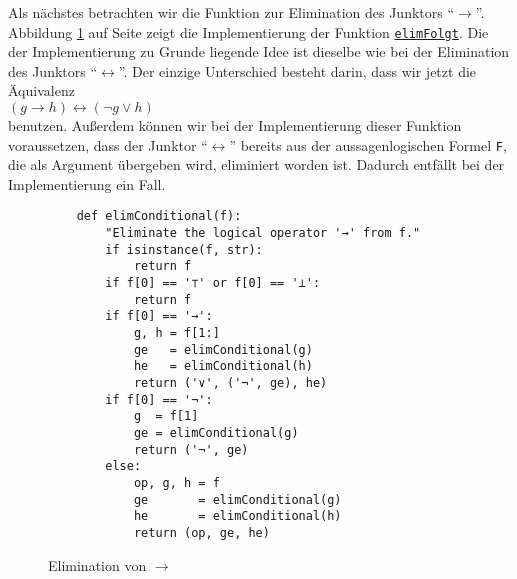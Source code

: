 Als nächstes betrachten wir die Funktion zur Elimination des Junktors ``$\rightarrow$''. 
Abbildung
\ref{fig:eliminate-folgt} auf Seite \pageref{fig:eliminate-folgt} zeigt die
Implementierung der Funktion
\href{https://github.com/karlstroetmann/Logic/blob/master/Python/CNF.ipynb}{\texttt{elimFolgt}}.
Die der Implementierung zu Grunde liegende Idee ist dieselbe wie bei der Elimination des
Junktors ``$\leftrightarrow$''.  Der einzige Unterschied besteht darin, dass wir jetzt die
Äquivalenz \\[0.2cm]
\hspace*{1.3cm}
$(g \rightarrow h) \leftrightarrow (\neg g \vee h)$ \\[0.2cm]
benutzen.  Außerdem können wir bei der Implementierung dieser Funktion voraussetzen, dass der Junktor ``$\leftrightarrow$''
bereits aus der aussagenlogischen Formel \texttt{F}, die als Argument übergeben wird, eliminiert worden ist.
Dadurch entfällt bei der Implementierung ein Fall. 

\begin{figure}[!ht]
  \centering
\begin{verbatim}
    def elimConditional(f):
        "Eliminate the logical operator '→' from f."
        if isinstance(f, str): 
            return f
        if f[0] == '⊤' or f[0] == '⊥':
            return f
        if f[0] == '→':
            g, h = f[1:]
            ge   = elimConditional(g)
            he   = elimConditional(h)
            return ('∨', ('¬', ge), he)
        if f[0] == '¬':
            g  = f[1]
            ge = elimConditional(g)
            return ('¬', ge)
        else:
            op, g, h = f
            ge       = elimConditional(g)
            he       = elimConditional(h)
            return (op, ge, he)
\end{verbatim}
\vspace*{-0.3cm}
  \caption{Elimination von $\rightarrow$}
  \label{fig:eliminate-folgt}
\end{figure}
 
